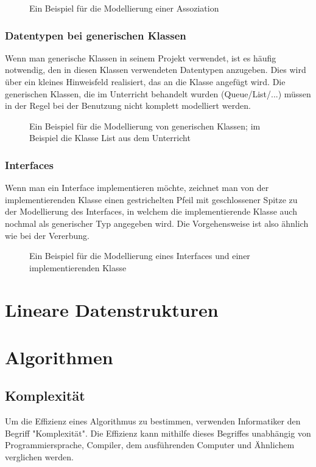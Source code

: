 \documentclass{article}
\begin{document}
	\begin{figure}[h!]
		\centering
		
		\caption{Ein Beispiel für die Modellierung einer Assoziation}
	\end{figure}

	\subsubsection{Datentypen bei generischen Klassen}
	Wenn man generische Klassen in seinem Projekt verwendet, ist es häufig notwendig, den in diesen Klassen verwendeten Datentypen anzugeben. Dies wird über ein kleines Hinweisfeld realisiert, das an die Klasse angefügt wird. Die generischen Klassen, die im Unterricht behandelt wurden (Queue/List/...) müssen in der Regel bei der Benutzung nicht komplett modelliert werden. 

	\begin{figure}[h!]
		\centering
		
		\caption{Ein Beispiel für die Modellierung von generischen Klassen; im Beispiel die Klasse List aus dem Unterricht}
	\end{figure}

	\subsubsection{Interfaces}
	Wenn man ein Interface implementieren möchte, zeichnet man von der implementierenden Klasse einen gestrichelten Pfeil mit geschlossener Spitze zu der Modellierung des Interfaces, in welchem die implementierende Klasse auch nochmal als generischer Typ angegeben wird. Die Vorgehensweise ist also ähnlich wie bei der Vererbung.

	\begin{figure}[h!]
		\centering
		
		\caption{Ein Beispiel für die Modellierung eines Interfaces und einer implementierenden Klasse}
	\end{figure}
	

	\section{Lineare Datenstrukturen}

	\section{Algorithmen}
	\subsection{Komplexität}
	Um die Effizienz eines Algorithmus zu bestimmen, verwenden Informatiker den Begriff "Komplexität". Die Effizienz kann mithilfe dieses Begriffes unabhängig von Programmiersprache, Compiler, dem ausführenden Computer und Ähnlichem verglichen werden.
\end{document}
